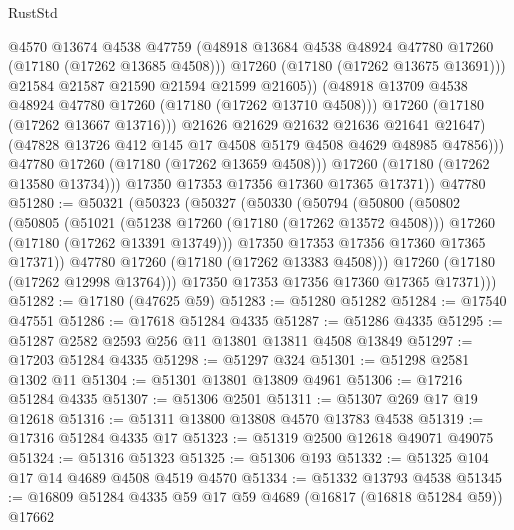 \begin{lexlean}{RustStd}
\begin{coremodule}
{\begin{coremodule}
{{{{{{{{{{{{{{{{{{{{{{{{{{{{{{{{{{{{{{{{{{{{{{{{{{{{{{{                          @4570
                          @13674
                          @4538
                          @47759
                          (@48918 @13684 @4538 @48924 @47780 @17260 (@17180 (@17262 @13685 @4508)))
                          @17260
                          (@17180 (@17262 @13675 @13691)))
                        @21584
                        @21587
                        @21590
                        @21594
                        @21599
                        @21605))
                    (@48918 @13709 @4538 @48924 @47780 @17260 (@17180 (@17262 @13710 @4508)))
                    @17260
                    (@17180 (@17262 @13667 @13716)))
                  @21626
                  @21629
                  @21632
                  @21636
                  @21641
                  @21647)
                (@47828 @13726 @412 @145 @17 @4508 @5179 @4508 @4629 @48985 @47856)))
            @47780
            @17260
            (@17180 (@17262 @13659 @4508)))
          @17260
          (@17180 (@17262 @13580 @13734)))
        @17350
        @17353
        @17356
        @17360
        @17365
        @17371))
    @47780
@51280 := @50321
    (@50323
      (@50327
        (@50330
          (@50794
            (@50800
              (@50802
                (@50805
                  (@51021
                    (@51238 @17260 (@17180 (@17262 @13572 @4508)))
                    @17260
                    (@17180 (@17262 @13391 @13749)))
                  @17350
                  @17353
                  @17356
                  @17360
                  @17365
                  @17371))
              @47780
              @17260
              (@17180 (@17262 @13383 @4508)))
            @17260
            (@17180 (@17262 @12998 @13764)))
          @17350
          @17353
          @17356
          @17360
          @17365
          @17371)))
@51282 := @17180 (@47625 @59)
@51283 := @51280 @51282
@51284 := @17540 @47551
@51286 := @17618 @51284 @4335
@51287 := @51286 @4335
@51295 := @51287 @2582 @2593 @256 @11 @13801 @13811 @4508 @13849
@51297 := @17203 @51284 @4335
@51298 := @51297 @324
@51301 := @51298 @2581 @1302 @11
@51304 := @51301 @13801 @13809 @4961
@51306 := @17216 @51284 @4335
@51307 := @51306 @2501
@51311 := @51307 @269 @17 @19 @12618
@51316 := @51311 @13800 @13808 @4570 @13783 @4538
@51319 := @17316 @51284 @4335 @17
@51323 := @51319 @2500 @12618 @49071 @49075
@51324 := @51316 @51323
@51325 := @51306 @193
@51332 := @51325 @104 @17 @14 @4689 @4508 @4519 @4570
@51334 := @51332 @13793 @4538
@51345 := @16809 @51284 @4335 @59 @17 @59 @4689 (@16817 (@16818 @51284 @59)) @17662
}}}}}}}}}}}}}}}}}}}}}}}}}}}}}}}}}}}}}}}}}}}}}}}}}}}}}}}
\end{coremodule}}
\end{coremodule}
\end{lexlean}
